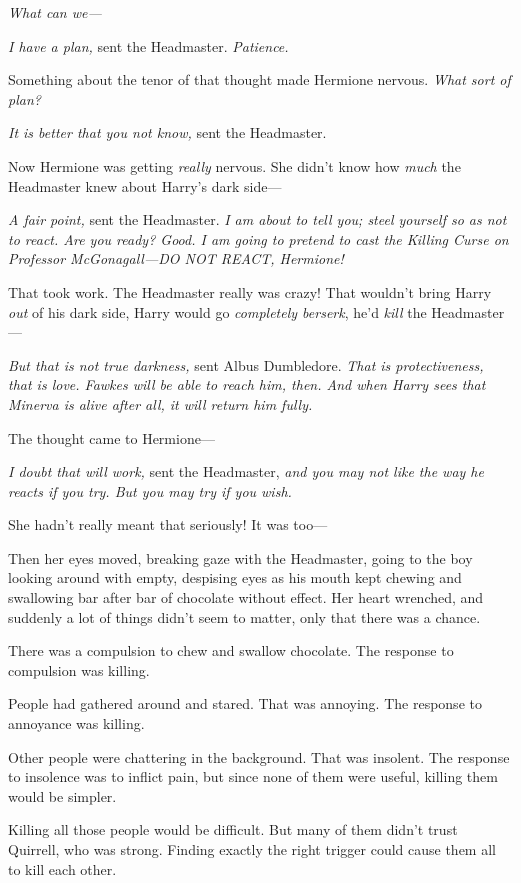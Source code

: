 \emph{What can we—}

\emph{I have a plan,} sent the Headmaster. \emph{Patience.}

Something about the tenor of that thought made Hermione nervous. \emph{What sort of plan?}

\emph{It is better that you not know,} sent the Headmaster.

Now Hermione was getting \emph{really} nervous. She didn’t know how \emph{much} the Headmaster knew about Harry’s dark side—

\emph{A fair point,} sent the Headmaster. \emph{I am about to tell you; steel yourself so as not to react. Are you ready? Good. I am going to pretend to cast the Killing Curse on Professor McGonagall—DO NOT REACT, Hermione!}

That took work. The Headmaster really was crazy! That wouldn’t bring Harry \emph{out} of his dark side, Harry would go \emph{completely berserk}, he’d \emph{kill} the Headmaster—

\emph{But that is not true darkness,} sent Albus Dumbledore. \emph{That is protectiveness, that is love. Fawkes will be able to reach him, then. And when Harry sees that Minerva is alive after all, it will return him fully.}

The thought came to Hermione—

\emph{I doubt that will work,} sent the Headmaster, \emph{and you may not like the way he reacts if you try. But you may try if you wish.}

She hadn’t really meant that seriously! It was too—

Then her eyes moved, breaking gaze with the Headmaster, going to the boy looking around with empty, despising eyes as his mouth kept chewing and swallowing bar after bar of chocolate without effect. Her heart wrenched, and suddenly a lot of things didn’t seem to matter, only that there was a chance.

\later

There was a compulsion to chew and swallow chocolate. The response to compulsion was killing.

People had gathered around and stared. That was annoying. The response to annoyance was killing.

Other people were chattering in the background. That was insolent. The response to insolence was to inflict pain, but since none of them were useful, killing them would be simpler.

Killing all those people would be difficult. But many of them didn’t trust Quirrell, who was strong. Finding exactly the right trigger could cause them all to kill each other.

